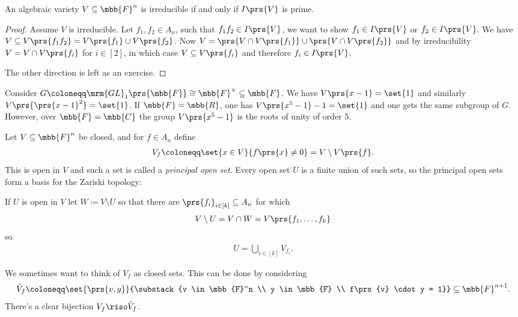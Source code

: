 \documentclass[10pt,a4paper,twoside,openany,hidelinks]{book}
\begin{document}
\begin{proposition}
An algebraic variety $V \subseteq \mbb{F}^n$ is irreducible if and only if $I\prs{V}$ is prime.
\end{proposition}

\begin{proof}
Assume $V$ is irreducible. Let $f_1, f_2 \in A_n$, such that $f_1 f_2 \in I\prs{V}$, we want to show $f_1 \in I\prs{V}$ or $f_2 \in I\prs{V}$. We have $V \subseteq V\prs{f_1 f_2} = V\prs{f_1} \cup V\prs{f_2}$. Now $V = \prs{V \cap V\prs{f_1}} \cup \prs{V \cap V\prs{f_2}}$ and by irreducibility $V = V \cap V\prs{f_i}$ for $i \in [2]$, in which case $V \subseteq V\prs{f_i}$ and therefore $f_i \in I\prs{V}$.

The other direction is left as an exercise.
\end{proof}


\begin{example}
Consider $G \coloneqq \mrm{GL}_1\prs{\mbb{F}} \cong \mbb{F}^\times \subseteq \mbb{F}$.
We have $V\prs{x-1} = \set{1}$ and similarly $V\prs{\prs{x-1}^2} = \set{1}$. If $\mbb{F} = \mbb{R}$, one has $V\prs{x^5 - 1} - 1 = \set{1}$ and one gets the same subgroup of $G$.
However, over $\mbb{F} = \mbb{C}$ the group $V\prs{x^5 - 1}$ is the roots of unity of order $5$.
\end{example}

\begin{example}
Let $V \subseteq \mbb{F}^n$ be closed, and for $f \in A_n$ define
\begin{align*}
V_f \coloneqq \set{x \in V}{f\prs{x} \neq 0} = V \setminus V\prs{f} \text{.}
\end{align*}
This is open in $V$ and such a set is called a \emph{principal open set}.
Every open set $U$ is a finite union of such sets, so the principal open sets form a basis for the Zariski topology:

If $U$ is open in $V$ let $W \coloneqq V \setminus U$ so that there are $\prs{f_i}_{i \in [k]} \subseteq A_n$ for which
\begin{align*}
V \setminus U = V \cap W = V\prs{f_1, \ldots, f_k}
\end{align*}
so
\begin{align*}
U = \bigcup_{i \in [k]} V_{f_i} \text{.}
\end{align*}

We sometimes want to think of $V_f$ as closed sets. This can be done by considering
\begin{align*}
\tilde{V}_f \coloneqq \set{\prs{v,y}}{\substack{v \in \mbb{F}^n \\ y \in \mbb{F} \\ f\prs{v} \cdot y = 1}} \subseteq \mbb{F}^{n+1} \text{.}
\end{align*}
There's a clear bijection $V_f \riso \tilde{V}_f$.
\end{example}
\end{document}
